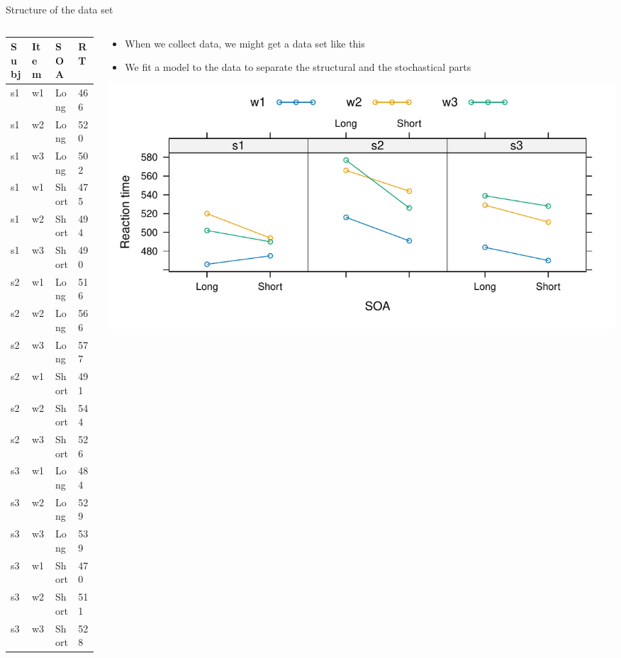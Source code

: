 \documentclass[aspectratio=169]{beamer}
\begin{document}
\begin{frame}{Structure of the data set}
  \begin{columns}
    \begin{column}{.4\textwidth}
      \centering
  \scriptsize
  \begin{tabular}{llll}
    \hline
    Subj & Item & SOA & RT  \\
    \hline
    s1 & w1 & Long  & 466 \\
    s1 & w2 & Long  & 520 \\
    s1 & w3 & Long  & 502 \\
    s1 & w1 & Short & 475 \\
    s1 & w2 & Short & 494 \\
    s1 & w3 & Short & 490 \\
    s2 & w1 & Long  & 516 \\
    s2 & w2 & Long  & 566 \\
    s2 & w3 & Long  & 577 \\
    s2 & w1 & Short & 491 \\
    s2 & w2 & Short & 544 \\
    s2 & w3 & Short & 526 \\
    s3 & w1 & Long  & 484 \\
    s3 & w2 & Long  & 529 \\
    s3 & w3 & Long  & 539 \\
    s3 & w1 & Short & 470 \\
    s3 & w2 & Short & 511 \\
    s3 & w3 & Short & 528 \\
    \hline
  \end{tabular}
    \end{column}
    \begin{column}{.6\textwidth}
      \begin{itemize}
        \item When we collect data, we might get a data set like this
        \item We fit a model to the data to separate the structural and the
          stochastical parts
      \end{itemize}
\includegraphics[scale=.5]{fig/baayen_ex}
    \end{column}
  \end{columns}
\end{frame}
\end{document}
